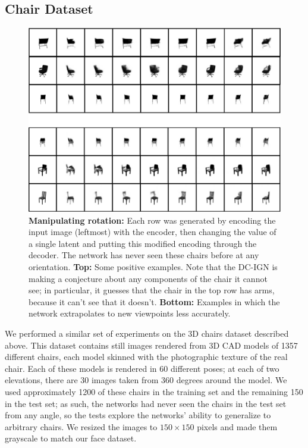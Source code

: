 \documentclass[12pt,twoside]{mitthesis}
\begin{document}
\subsection{Chair Dataset}\label{chair-dataset}

\begin{figure}[htbp]
\centering
\includegraphics{figures/chairs_combo.png}
\caption{\label{fig:chairpose}\textbf{Manipulating rotation:} Each row
was generated by encoding the input image (leftmost) with the encoder,
then changing the value of a single latent and putting this modified
encoding through the decoder. The network has never seen these chairs
before at any orientation. \textbf{Top:} Some positive examples. Note
that the DC-IGN is making a conjecture about any components of the chair
it cannot see; in particular, it guesses that the chair in the top row
has arms, because it can't see that it doesn't. \textbf{Bottom:}
Examples in which the network extrapolates to new viewpoints less
accurately.}
\end{figure}

We performed a similar set of experiments on the 3D chairs dataset
described above. This dataset contains still images rendered from 3D CAD
models of 1357 different chairs, each model skinned with the
photographic texture of the real chair. Each of these models is rendered
in 60 different poses; at each of two elevations, there are 30 images
taken from 360 degrees around the model. We used approximately 1200 of
these chairs in the training set and the remaining 150 in the test set;
as such, the networks had never seen the chairs in the test set from any
angle, so the tests explore the networks' ability to generalize to
arbitrary chairs. We resized the images to $150 \times 150$ pixels and
made them grayscale to match our face dataset.
\end{document}
